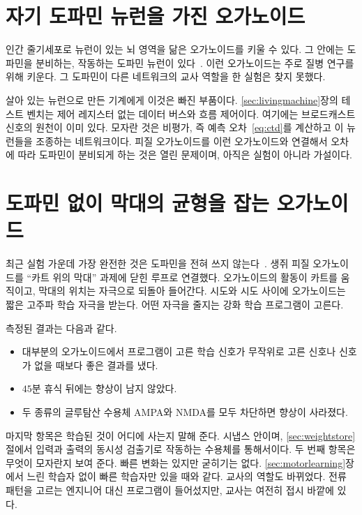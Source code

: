 \section{자기 도파민 뉴런을 가진 오가노이드}
\label{sec:midbrainorg}

인간 줄기세포로  뉴런이 있는 뇌 영역을 닮은 오가노이드를 키울 수 있다. 그 안에는 도파민을 분비하는, 작동하는 도파민 뉴런이 있다~\cite{Jo2016}. 이런 오가노이드는 주로 질병 연구를 위해 키운다. 그 도파민이 다른 네트워크의 교사 역할을 한 실험은 찾지 못했다.

살아 있는 뉴런으로 만든 기계에게 이것은 빠진 부품이다. \ref{sec:livingmachine}장의 테스트 벤치는 제어 레지스터 없는 데이터 버스와 흐름 제어이다. 여기에는 브로드캐스트 신호의 원천이 이미 있다. 모자란 것은 비평가, 즉 예측 오차~\eqref{eq:ctd}를 계산하고 이 뉴런들을 조종하는 네트워크이다. 피질 오가노이드를 이런 오가노이드와 연결해서 오차에 따라 도파민이 분비되게 하는 것은 열린 문제이며, 아직은 실험이 아니라 가설이다.

\section{도파민 없이 막대의 균형을 잡는 오가노이드}
\label{sec:cartpole}

최근 실험 가운데 가장 완전한 것은 도파민을 전혀 쓰지 않는다~\cite{Robbins2026}. 생쥐 피질 오가노이드를 “카트 위의 막대” 과제에 닫힌 루프로 연결했다. 오가노이드의 활동이 카트를 움직이고, 막대의 위치는 자극으로 되돌아 들어간다. 시도와 시도 사이에 오가노이드는 짧은 고주파 학습 자극을 받는다. 어떤 자극을 줄지는 강화 학습 프로그램이 고른다.

측정된 결과는 다음과 같다.
\begin{itemize}
\item 대부분의 오가노이드에서 프로그램이 고른 학습 신호가 무작위로 고른 신호나 신호가 없을 때보다 좋은 결과를 냈다.
\item $45$분 휴식 뒤에는 향상이 남지 않았다.
\item 두 종류의 글루탐산 수용체 AMPA와 NMDA를 모두 차단하면 향상이 사라졌다.
\end{itemize}

마지막 항목은 학습된 것이 어디에 사는지 말해 준다.  시냅스 안이며, \ref{sec:weightstore}절에서 입력과 출력의 동시성 검출기로 작동하는 수용체를 통해서이다. 두 번째 항목은 무엇이 모자란지 보여 준다. 빠른 변화는 있지만 굳히기는 없다. \ref{sec:motorlearning}장에서 느린 학습자 없이 빠른 학습자만 있을 때와 같다. 교사의 역할도 바뀌었다. 전류 패턴을 고르는 엔지니어 대신 프로그램이 들어섰지만, 교사는 여전히 접시 바깥에 있다.

